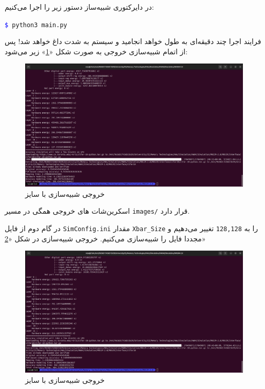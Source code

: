 \documentclass[12pt]{exam}
\begin{document}
\begin{questions}
در دایرکتوری شبیه‌ساز دستور زیر را اجرا می‌کنیم:

\begin{latin}
	\texttt{\textcolor{blue}{\$} python3 main.py}
\end{latin}

فرایند اجرا چند دقیقه‌ای به طول خواهد انجامید و سیستم به شدت داغ خواهد شد! پس از اتمام شبیه‌سازی خروجی به صورت شکل «\textcolor{blue}{\ref*{خروجی شبیه‌سازی با سایز256x256}}» زیر می‌شود:

\begin{figure}[h]
	\centering
	\includegraphics[width=1\textwidth]{images/256x256/0-main-py.png}
	\caption{خروجی شبیه‌سازی با سایز }
	\label{خروجی شبیه‌سازی با سایز256x256}
\end{figure}

اسکرین‌شات های خروجی همگی در مسیر \texttt{images/} قرار دارد.

در گام دوم از فایل \texttt{SimConfig.ini} مقدار \texttt{Xbar\_Size} را به \texttt{128,128} تغییر می‌دهیم و مجددا فایل را شبیه‌سازی می‌کنیم. خروجی شبیه‌سازی در شکل «\textcolor{blue}{\ref{خروجی شبیه‌سازی با 128x128}}»


\begin{figure}[h]
	\centering
	\includegraphics[width=1\textwidth]{images/128x128/0.png}
	\caption{خروجی شبیه‌سازی با سایز }
	\label{خروجی شبیه‌سازی با 128x128}
\end{figure}


\end{questions}
\end{document}
